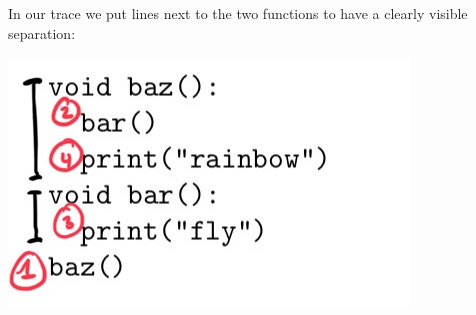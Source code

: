 In our trace we put lines next to the two functions to have a clearly visible separation:

\includegraphics[width=.4\textwidth]{1-trace-calls.jpeg}

